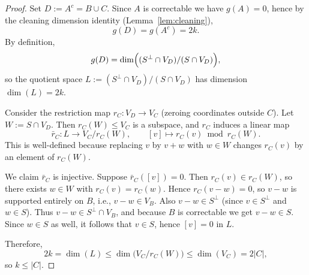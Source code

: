 \documentclass[10pt,a4paper]{amsart}
\begin{document}
\begin{proof}
Set $D := A^c = B \cup C$.  Since $A$ is correctable we have $g(A) = 0$, hence by the
cleaning dimension identity (Lemma~\ref{lem:cleaning}),
\[
  g(D) = g(A^c) = 2k.
\]
By definition,
\[
  g(D) = \dim\Bigl( (S^\perp \cap V_D) / (S \cap V_D) \Bigr),
\]
so the quotient space $L := (S^\perp \cap V_D) / (S \cap V_D)$ has dimension $\dim(L) = 2k$.

Consider the restriction map $r_C : V_D \to V_C$ (zeroing coordinates outside $C$).  Let
$W := S \cap V_D$.  Then $r_C(W) \le V_C$ is a subspace, and $r_C$ induces a linear map
\[
  \bar{r}_C : L \longrightarrow V_C / r_C(W),
  \qquad [v] \longmapsto r_C(v) \bmod r_C(W).
\]
This is well-defined because replacing $v$ by $v + w$ with $w \in W$ changes $r_C(v)$ by an
element of $r_C(W)$.

We claim $\bar{r}_C$ is injective.  Suppose $\bar{r}_C([v]) = 0$.  Then
$r_C(v) \in r_C(W)$, so there exists $w \in W$ with $r_C(v) = r_C(w)$.  Hence
$r_C(v - w) = 0$, so $v - w$ is supported entirely on $B$, i.e.,
$v - w \in V_B$.  Also $v - w \in S^\perp$ (since $v \in S^\perp$ and $w \in S$).  Thus
$v - w \in S^\perp \cap V_B$, and because $B$ is correctable we get $v - w \in S$.  Since
$w \in S$ as well, it follows that $v \in S$, hence $[v] = 0$ in $L$.

Therefore,
\[
  2k = \dim(L) \le \dim\bigl( V_C / r_C(W) \bigr) \le \dim(V_C) = 2|C|,
\]
so $k \le |C|$.
\end{proof}
\end{document}
